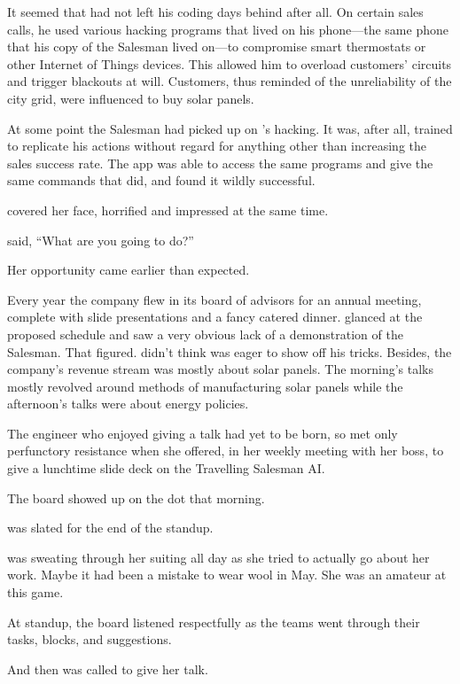 It seemed that \energyJerk{} had not left his coding days behind after all. On certain sales calls, he used various hacking programs that lived on his phone---the same phone that his copy of the Salesman lived on---to compromise smart thermostats or other Internet of Things devices. This allowed him to overload customers' circuits and trigger blackouts at will. Customers, thus reminded of the unreliability of the city grid, were influenced to buy solar panels.

At some point the Salesman had picked up on \energyJerk{}'s hacking. It was, after all, trained to replicate his actions without regard for anything other than increasing the sales success rate. The app was able to access the same programs and give the same commands that \energyJerk{} did, and found it wildly successful.

{\protag} covered her face, horrified and impressed at the same time.

{\sidetag} said, ``What are you going to do?''

\sectionBreak{}

Her opportunity came earlier than expected.

Every year the company flew in its board of advisors for an annual meeting, complete with slide presentations and a fancy catered dinner. {\protag} glanced at the proposed schedule and saw a very obvious lack of a demonstration of the Salesman. That figured. {\protag} didn't think \energyJerk{} was eager to show off his tricks. Besides, the company's revenue stream was mostly about solar panels. The morning's talks mostly revolved around methods of manufacturing solar panels while the afternoon's talks were about energy policies.

The engineer who enjoyed giving a talk had yet to be born, so {\protag} met only perfunctory resistance when she offered, in her weekly meeting with her boss, to give a lunchtime slide deck on the Travelling Salesman AI.

The board showed up on the dot that morning.

{\protag} was slated for the end of the standup.

{\protag} was sweating through her suiting all day as she tried to actually go about her work. Maybe it had been a mistake to wear wool in May. She was an amateur at this game.

At standup, the board listened respectfully as the teams went through their tasks, blocks, and suggestions.

And then {\protag} was called to give her talk.

